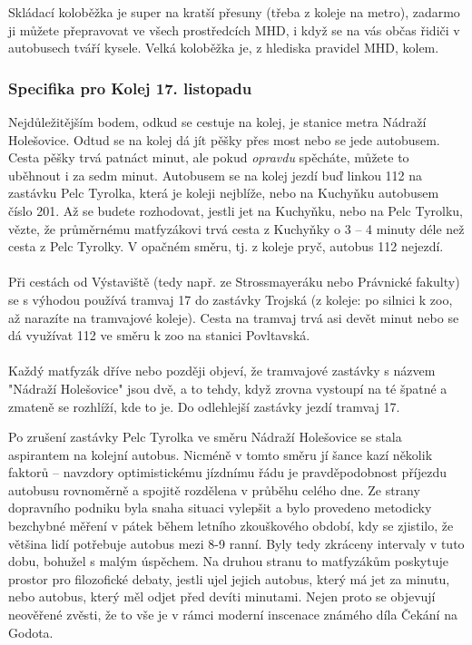 Skládací koloběžka je super na kratší přesuny (třeba z koleje na metro), zadarmo
ji můžete přepravovat ve všech prostředcích MHD, i když se na vás občas řidiči v
autobusech tváří kysele. Velká koloběžka je, z hlediska pravidel MHD, kolem.


\subsubsection{Specifika pro Kolej 17. listopadu}
Nejdůležitějším bodem, odkud se cestuje na kolej, je stanice metra Nádraží
Holešovice. Odtud se na kolej dá jít pěšky přes most nebo se jede autobusem.
Cesta pěšky trvá patnáct minut, ale pokud \textit{opravdu} spěcháte, můžete to
uběhnout i za sedm minut. Autobusem se na kolej jezdí buď linkou 112 na zastávku
Pelc Tyrolka, která je koleji nejblíže, nebo na Kuchyňku autobusem číslo 201. Až
se budete rozhodovat, jestli jet na Kuchyňku, nebo na Pelc Tyrolku, vězte, že
průměrnému matfyzákovi trvá cesta z Kuchyňky o 3 – 4 minuty déle než cesta z
Pelc Tyrolky. V opačném směru, tj. z koleje pryč, autobus 112 nejezdí.
\\\\
Při cestách od Výstaviště (tedy např. ze Strossmayeráku nebo Právnické fakulty)
se s výhodou používá tramvaj 17 do zastávky Trojská (z koleje: po silnici k zoo,
až narazíte na tramvajové koleje). Cesta na tramvaj trvá asi devět minut nebo se
dá využívat 112 ve směru k zoo na stanici Povltavská.
\\\\
Každý matfyzák dříve nebo později objeví, že tramvajové zastávky s názvem
"Nádraží Holešovice" jsou dvě, a to tehdy, když zrovna vystoupí na té špatné a
zmateně se rozhlíží, kde to je. Do odlehlejší zastávky jezdí tramvaj 17.

Po zrušení zastávky Pelc Tyrolka ve směru Nádraží Holešovice se stala aspirantem
na kolejní autobus. Nicméně v tomto směru jí šance kazí několik faktorů –
navzdory optimistickému jízdnímu řádu je pravděpodobnost příjezdu autobusu
rovnoměrně a spojitě rozdělena v průběhu celého dne. Ze strany dopravního
podniku byla snaha situaci vylepšit a bylo provedeno metodicky bezchybné měření
v pátek během letního zkouškového období, kdy se zjistilo, že většina lidí
potřebuje autobus mezi 8-9 ranní. Byly tedy zkráceny intervaly v tuto dobu,
bohužel s malým úspěchem. Na druhou stranu to matfyzákům poskytuje prostor pro
filozofické debaty, jestli ujel jejich autobus, který má jet za minutu, nebo
autobus, který měl odjet před devíti minutami. Nejen proto se objevují neověřené
zvěsti, že to vše je v rámci moderní inscenace známého díla Čekání na Godota.

